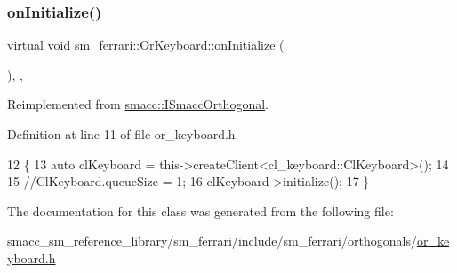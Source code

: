 \subsubsection{\texorpdfstring{on\+Initialize()}{onInitialize()}}
{\footnotesize\ttfamily virtual void sm\+\_\+ferrari\+::\+Or\+Keyboard\+::on\+Initialize (\begin{DoxyParamCaption}{ }\end{DoxyParamCaption})\hspace{0.3cm}{\ttfamily [inline]}, {\ttfamily [override]}, {\ttfamily [virtual]}}



Reimplemented from \hyperlink{classsmacc_1_1ISmaccOrthogonal_a6bb31c620cb64dd7b8417f8705c79c7a}{smacc\+::\+I\+Smacc\+Orthogonal}.



Definition at line 11 of file or\+\_\+keyboard.\+h.


\begin{DoxyCode}
12     \{
13         \textcolor{keyword}{auto} clKeyboard = this->createClient<cl\_keyboard::ClKeyboard>();
14         
15         \textcolor{comment}{//ClKeyboard.queueSize = 1;}
16         clKeyboard->initialize();
17     \}
\end{DoxyCode}


The documentation for this class was generated from the following file\+:\begin{DoxyCompactItemize}
\item 
smacc\+\_\+sm\+\_\+reference\+\_\+library/sm\+\_\+ferrari/include/sm\+\_\+ferrari/orthogonals/\hyperlink{sm__ferrari_2include_2sm__ferrari_2orthogonals_2or__keyboard_8h}{or\+\_\+keyboard.\+h}\end{DoxyCompactItemize}
